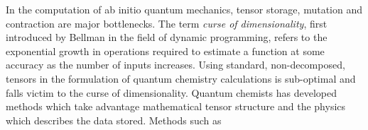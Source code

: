 In the computation of ab initio quantum mechanics, tensor storage, mutation and contraction are major bottlenecks. The term {\em curse of dimensionality}, first introduced by Bellman\cite{Chen2009} in the field of dynamic programming, refers to the exponential growth in operations required to estimate a function at some accuracy as the number of inputs increases. Using standard, non-decomposed, tensors in the formulation of quantum chemistry calculations is sub-optimal and falls victim to the curse of dimensionality.  Quantum chemists has developed methods which take advantage mathematical tensor structure and the physics which describes the data stored.  Methods such as 

